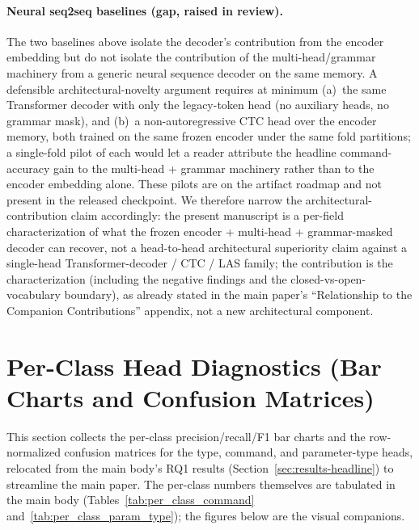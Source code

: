 \documentclass[11pt,a4paper]{article}
\begin{document}
\paragraph{Neural seq2seq baselines (gap, raised in review).} The two baselines above isolate the decoder's contribution from the encoder embedding but do not isolate the contribution of the multi-head/grammar machinery from a generic neural sequence decoder on the same memory. A defensible architectural-novelty argument requires at minimum (a)~the same Transformer decoder with only the legacy-token head (no auxiliary heads, no grammar mask), and (b)~a non-autoregressive CTC head over the encoder memory, both trained on the same frozen encoder under the same fold partitions; a single-fold pilot of each would let a reader attribute the headline command-accuracy gain to the multi-head + grammar machinery rather than to the encoder embedding alone. These pilots are on the artifact roadmap and not present in the released checkpoint. We therefore narrow the architectural-contribution claim accordingly: the present manuscript is a per-field characterization of what the frozen encoder + multi-head + grammar-masked decoder can recover, not a head-to-head architectural superiority claim against a single-head Transformer-decoder / CTC / LAS family; the contribution is the characterization (including the negative findings and the closed-vs-open-vocabulary boundary), as already stated in the main paper's ``Relationship to the Companion Contributions'' appendix, not a new architectural component.

\section{Per-Class Head Diagnostics (Bar Charts and Confusion Matrices)}
\label{app:per-class-diagnostics}

This section collects the per-class precision/recall/F1 bar charts and the
row-normalized confusion matrices for the type, command, and parameter-type
heads, relocated from the main body's RQ1 results (Section~\ref{sec:results-headline})
to streamline the main paper. The per-class numbers themselves are tabulated in
the main body (Tables~\ref{tab:per_class_command} and~\ref{tab:per_class_param_type});
the figures below are the visual companions.
\end{document}
